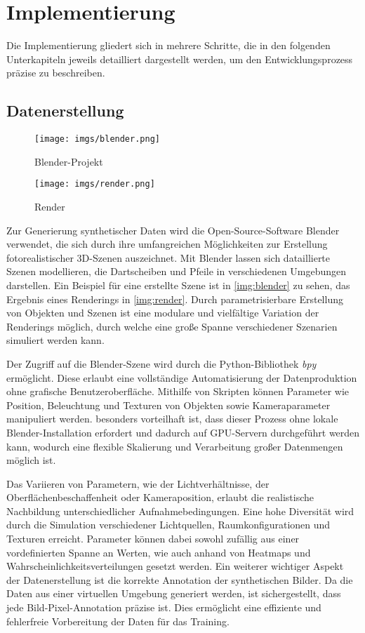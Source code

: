 \section{Implementierung}
\label{sec:implementierung}
Die Implementierung gliedert sich in mehrere Schritte, die in den folgenden Unterkapiteln jeweils detailliert dargestellt werden, um den Entwicklungsprozess präzise zu beschreiben.

\subsection{Datenerstellung}
\label{sec:implementierung:datenerstellung}

\begin{figure}
    \centering
    \texttt{[image: imgs/blender.png]}
    \caption{Blender-Projekt}
    \label{img:blender}
\end{figure}

\begin{figure}
    \centering
    \texttt{[image: imgs/render.png]}
    \caption{Render}
    \label{img:render}
\end{figure}

Zur Generierung synthetischer Daten wird die Open-Source-Software Blender verwendet, die sich durch ihre umfangreichen Möglichkeiten zur Erstellung fotorealistischer 3D-Szenen auszeichnet. Mit Blender lassen sich dataillierte Szenen modellieren, die Dartscheiben und Pfeile in verschiedenen Umgebungen darstellen. Ein Beispiel für eine erstellte Szene ist in \autoref{img:blender} zu sehen, das Ergebnis eines Renderings in \autoref{img:render}. Durch parametrisierbare Erstellung von Objekten und Szenen ist eine modulare und vielfältige Variation der Renderings möglich, durch welche eine große Spanne verschiedener Szenarien simuliert werden kann.

Der Zugriff auf die Blender-Szene wird durch die Python-Bibliothek \textit{bpy} ermöglicht. Diese erlaubt eine vollständige Automatisierung der Datenproduktion ohne grafische Benutzeroberfläche. Mithilfe von Skripten können Parameter wie Position, Beleuchtung und Texturen von Objekten sowie Kameraparameter manipuliert werden. besonders vorteilhaft ist, dass dieser Prozess ohne lokale Blender-Installation erfordert und dadurch auf GPU-Servern durchgeführt werden kann, wodurch eine flexible Skalierung und Verarbeitung großer Datenmengen möglich ist.

Das Variieren von Parametern, wie der Lichtverhältnisse, der Oberflächenbeschaffenheit oder Kameraposition, erlaubt die realistische Nachbildung unterschiedlicher Aufnahmebedingungen. Eine hohe Diversität wird durch die Simulation verschiedener Lichtquellen, Raumkonfigurationen und Texturen erreicht. Parameter können dabei sowohl zufällig aus einer vordefinierten Spanne an Werten, wie auch anhand von Heatmaps und Wahrscheinlichkeitsverteilungen gesetzt werden. Ein weiterer wichtiger Aspekt der Datenerstellung ist die korrekte Annotation der synthetischen Bilder. Da die Daten aus einer virtuellen Umgebung generiert werden, ist sichergestellt, dass jede Bild-Pixel-Annotation präzise ist. Dies ermöglicht eine effiziente und fehlerfreie Vorbereitung der Daten für das Training.

